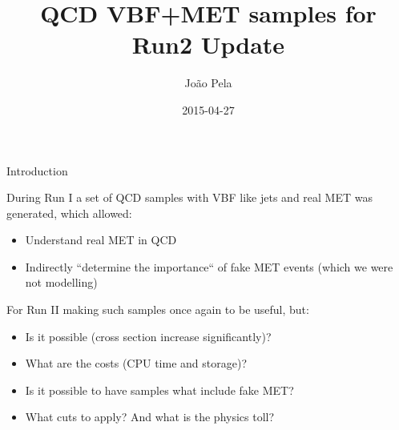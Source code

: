 \documentclass[8pt]{beamer}
\author[J. Pela]{João Pela}
\title{QCD VBF+MET samples for Run2 Update}
\institute[ICL]{Imperial College London}
\date{2015-04-27}
\begin{document}
\setlength{\unitlength}{1mm}

\begin{frame}
  \titlepage
\end{frame}

\begin{frame}{Introduction}

During Run I a set of QCD samples with VBF like jets and real MET was generated, which allowed:

\begin{block}
  
\begin{itemize}
  \item Understand real MET in QCD
  \item Indirectly ``determine the importance`` of fake MET events (which we were not modelling)
\end{itemize}

\end{block}

For Run II making such samples once again to be useful, but:

\begin{block}

\begin{itemize}
  \item Is it possible (cross section increase significantly)?
  \item What are the costs (CPU time and storage)?
  \item Is it possible to have samples what include fake MET?
  \item What cuts to apply? And what is the physics toll?
\end{itemize}
  
\end{block}

\end{frame}
\end{document}
